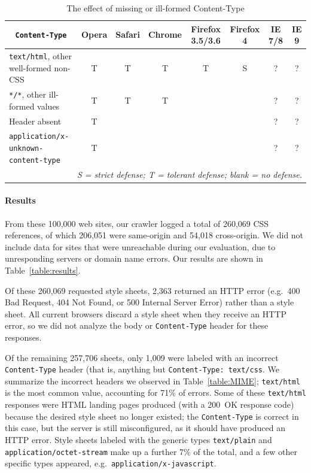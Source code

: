 \documentclass{acm_proc_article-sp}
\begin{document}
\begin{table}
\centering
\begin{tabular}{lccccccc}
\toprule
\multicolumn{1}{c}{\texttt{Content-Type}}
&Opera&Safari&Chrome&Firefox 3.5/3.6&Firefox 4&IE 7/8&IE 9\\
\midrule
\texttt{text/html},
other well-formed non-CSS                   & T & T & T & T & S & ? & ?\\
\texttt{*/*}, other ill-formed values       & T & T & T &   &   & ? & ?\\
Header absent                               & T &   &   &   &   & ? & ?\\
\texttt{application/x-unknown-content-type} & T &   &   &   &   & ? & ?\\
\bottomrule
\multicolumn{8}{r}{\vrule height10pt width0pt\relax\itshape
  S = strict defense; T = tolerant defense; blank = no defense.}
\end{tabular}
\caption{The effect of missing or ill-formed
  Content-Type}\label{table:adoption}
\end{table}

\paragraph{Results}
From these 100,000 web sites, our crawler logged a total of 260,069
CSS references, of which 206,051 were same-origin and 54,018
cross-origin.  We did not include data for sites that were unreachable
during our evaluation, due to unresponding servers or domain name
errors. Our results are shown in Table~\ref{table:results}.

Of these 260,069 requested style sheets, 2,363 returned an HTTP error
(e.g.\ 400 Bad Request, 404 Not Found, or 500 Internal Server Error)
rather than a style sheet.  All current browsers discard a style sheet
when they receive an HTTP error, so we did not analyze the body or
\verb|Content-Type| header for these responses.

Of the remaining 257,706 sheets, only 1,009 were labeled with an
incorrect \verb|Content-Type| header (that is, anything but
\verb|Content-Type: text/css|.  We summarize the incorrect headers we
observed in Table~\ref{table:MIME}; \verb|text/html| is the most
common value, accounting for 71\% of errors.  Some of these
\verb|text/html| responses were HTML landing pages produced (with a
200~OK response code) because the desired style sheet no longer
existed; the \verb|Content-Type| is correct in this case, but the
server is still misconfigured, as it should have produced an HTTP
error.  Style sheets labeled with the generic types \verb|text/plain|
and \verb|application/octet-stream| make up a further 7\% of the
total, and a few other specific types appeared,
e.g.~\verb|application/x-javascript|.
\end{document}
